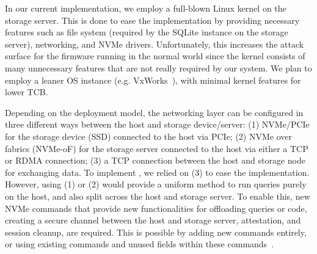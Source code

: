  In our current implementation, we employ a full-blown Linux kernel on the storage server. This is done to ease the implementation by providing necessary features such as file system (required by the SQLite instance on the storage server), networking, and NVMe drivers. Unfortunately, this increases the attack surface for the firmware running in the normal world since the kernel consists of many unnecessary features that are not really required by our system.  We plan to employ a leaner OS instance (e.g. VxWorks~\cite{vxworks}), with minimal kernel features for lower TCB. %

Depending on the deployment model, the networking layer can be configured in three different ways between the host and storage device/server: (1) NVMe/PCIe for the storage device (SSD) connected to the host via PCIe; (2) NVMe over fabrics (NVMe-oF) for the storage server connected to the host via either a TCP or RDMA connection; (3) a TCP connection between the host and storage node for exchanging data. To implement \project, we relied on (3) to ease the implementation. However, using (1) or (2) would provide a uniform method to run queries purely on the host, and also split across the host and storage server. To enable this, new NVMe commands that provide new functionalities for offloading queries or code, creating a secure channel between the host and storage server, attestation, and session cleanup, are required. This is possible by adding new commands entirely, or using existing commands and unused fields within these commands~\cite{blockNDP}.




